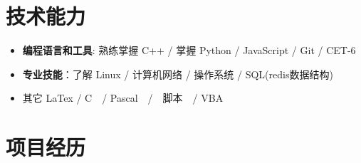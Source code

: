 \documentclass{resume}
\begin{document}
\section{技术能力}
\begin{itemize}[parsep=0.2ex]
	\item \textbf{编程语言和工具}: 熟练掌握 C++ / 掌握 Python / JavaScript / Git / CET-6
	\item \textbf{专业技能}：了解 Linux / 计算机网络 / 操作系统 / SQL(redis数据结构)
	\item 其它 LaTex  / C　/ Pascal　/　脚本　/ VBA
\end{itemize}


\section{项目经历}
  
\end{document}
